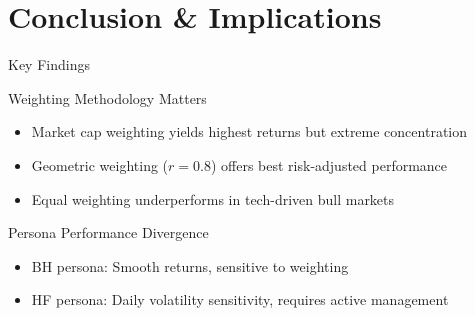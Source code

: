 \documentclass[12pt, aspectratio=43]{beamer}
\begin{document}
	\section{Conclusion \& Implications}
	
	\begin{frame}{Key Findings}
		\begin{block}{Weighting Methodology Matters}
			\begin{itemize}
				\item Market cap weighting yields highest returns but extreme concentration
				\item Geometric weighting ($r=0.8$) offers best risk-adjusted performance
				\item Equal weighting underperforms in tech-driven bull markets
			\end{itemize}
		\end{block}
		
		\begin{block}{Persona Performance Divergence}
			\begin{itemize}
				\item BH persona: Smooth returns, sensitive to weighting
				\item HF persona: Daily volatility sensitivity, requires active management
			\end{itemize}
		\end{block}
	\end{frame}
	
\end{document}

